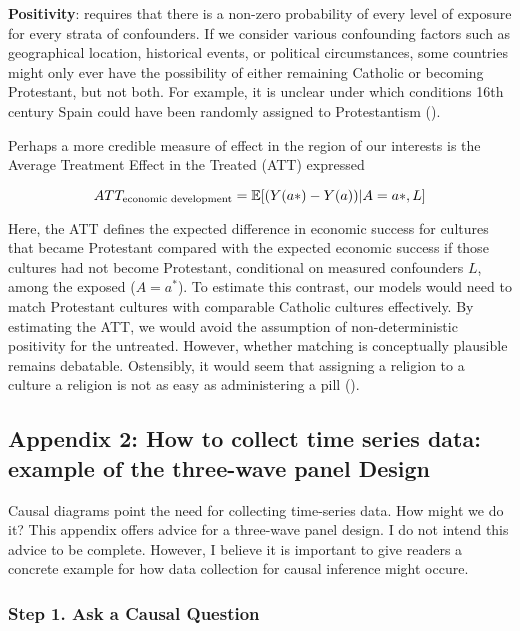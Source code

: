 \documentclass[
  singlecolumn,
  9pt]{article}
\begin{document}
\textbf{Positivity}: requires that there is a non-zero probability of
every level of exposure for every strata of confounders. If we consider
various confounding factors such as geographical location, historical
events, or political circumstances, some countries might only ever have
the possibility of either remaining Catholic or becoming Protestant, but
not both. For example, it is unclear under which conditions 16th century
Spain could have been randomly assigned to Protestantism
().

Perhaps a more credible measure of effect in the region of our interests
is the Average Treatment Effect in the Treated (ATT) expressed

\[ATT_{\textnormal{economic~development}} = \mathbb{E}[(Y(a*)- Y(a))|A = a*,L]\]

Here, the ATT defines the expected difference in economic success for
cultures that became Protestant compared with the expected economic
success if those cultures had not become Protestant, conditional on
measured confounders \(L\), among the exposed (\(A = a^*\)). To estimate
this contrast, our models would need to match Protestant cultures with
comparable Catholic cultures effectively. By estimating the ATT, we
would avoid the assumption of non-deterministic positivity for the
untreated. However, whether matching is conceptually plausible remains
debatable. Ostensibly, it would seem that assigning a religion to a
culture a religion is not as easy as administering a pill
().

\subsection{Appendix 2: How to collect time series data: example of the
three-wave panel
Design}\label{appendix-2-how-to-collect-time-series-data-example-of-the-three-wave-panel-design}

Causal diagrams point the need for collecting time-series data. How
might we do it? This appendix offers advice for a three-wave panel
design. I do not intend this advice to be complete. However, I believe
it is important to give readers a concrete example for how data
collection for causal inference might occure.

\subsubsection{Step 1. Ask a Causal
Question}\label{step-1.-ask-a-causal-question}
\end{document}
